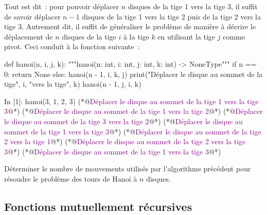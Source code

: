 \documentclass{magnolia}
\begin{document}
Tout est dit~: pour pouvoir déplacer $n$ disques de la tige 1 vers la tige 3, il suffit de
savoir déplacer $n-1$ disques de la tige 1 vers la tige 2 puis de la tige 2 vers la tige 3.
Autrement dit, il suffit de généraliser le problème de manière à décrire le déplacement
de $n$ disques de la tige $i$ à la tige $k$ en utilisant la tige $j$ comme pivot. Ceci
conduit à la fonction suivante~:
\begin{pythoncodeline}
def hanoi(n, i, j, k):
    """hanoi(n: int, i: int, j: int, k: int) -> NoneType"""
    if n == 0:
        return None
    else:
        hanoi(n - 1, i, k, j)
        print("Déplacer le disque au sommet de la tige", i, "vers la tige", k)
        hanoi(n - 1, j, i, k)
\end{pythoncodeline}
\begin{pythoncode}
In [1]: hanoi(3, 1, 2, 3)
(*@\textcolor{purple}{Déplacer le disque au sommet de la tige 1 vers la tige 3}@*)
(*@\textcolor{purple}{Déplacer le disque au sommet de la tige 1 vers la tige 2}@*)
(*@\textcolor{purple}{Déplacer le disque au sommet de la tige 3 vers la tige 2}@*)
(*@\textcolor{purple}{Déplacer le disque au sommet de la tige 1 vers la tige 3}@*)
(*@\textcolor{purple}{Déplacer le disque au sommet de la tige 2 vers la tige 1}@*)
(*@\textcolor{purple}{Déplacer le disque au sommet de la tige 2 vers la tige 3}@*)
(*@\textcolor{purple}{Déplacer le disque au sommet de la tige 1 vers la tige 3}@*)
\end{pythoncode}


\begin{exoUnique}
\exo Déterminer le nombre de mouvements utilisés par l'algorithme précédent
  pour résoudre le problème des tours de Hanoï à $n$ disques.
\end{exoUnique}


\subsection{Fonctions mutuellement récursives}
\end{document}
